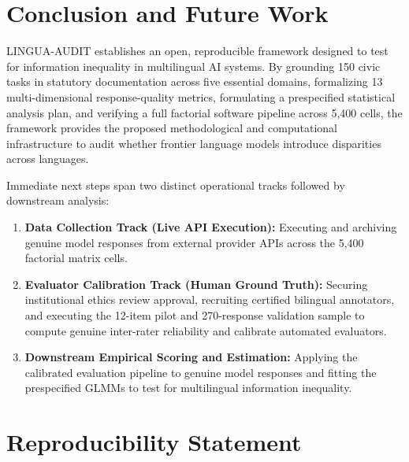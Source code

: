 \documentclass[11pt,a4paper]{article}
\begin{document}
\section{Conclusion and Future Work}
\label{sec:conclusion}

LINGUA-AUDIT establishes an open, reproducible framework designed to test for information inequality in multilingual AI systems. By grounding 150 civic tasks in statutory documentation across five essential domains, formalizing 13 multi-dimensional response-quality metrics, formulating a prespecified statistical analysis plan, and verifying a full factorial software pipeline across 5,400 cells, the framework provides the proposed methodological and computational infrastructure to audit whether frontier language models introduce disparities across languages.

Immediate next steps span two distinct operational tracks followed by downstream analysis:
\begin{enumerate}
  \item \textbf{Data Collection Track (Live API Execution):} Executing and archiving genuine model responses from external provider APIs across the 5,400 factorial matrix cells.
  \item \textbf{Evaluator Calibration Track (Human Ground Truth):} Securing institutional ethics review approval, recruiting certified bilingual annotators, and executing the 12-item pilot and 270-response validation sample to compute genuine inter-rater reliability and calibrate automated evaluators.
  \item \textbf{Downstream Empirical Scoring and Estimation:} Applying the calibrated evaluation pipeline to genuine model responses and fitting the prespecified GLMMs to test for multilingual information inequality.
\end{enumerate}

\section*{Reproducibility Statement}
\label{sec:reproducibility}
\end{document}
